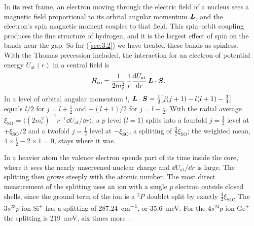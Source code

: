 In its rest frame, an electron moving through the electric field of a nucleus sees a magnetic field proportional to its orbital angular momentum $\bm{L}$, and the electron's spin magnetic moment couples to that field. This spin--orbit coupling produces the fine structure of hydrogen, and it is the largest effect of spin on the bands near the gap. So far (\cref{sec:3.2}) we have treated these bands as spinless. With the Thomas precession included, the interaction for an electron of potential energy $U_{\mathrm{at}}(r)$ in a central field is~\cite[Chap.~5]{sakurai2017modern}
\begin{equation}
  H_{\mathrm{so}} = \frac{1}{2m_e^2}\,\frac{1}{r}\frac{\mathrm{d} U_{\mathrm{at}}}{\mathrm{d} r}\,\bm{L}\cdot\bm{S} .
  \label{eq:3.3-HSO}
\end{equation}
In a level of orbital angular momentum $l$, $\bm{L}\cdot\bm{S} = \frac12[j(j+1) - l(l+1) - \frac34]$ equals $l/2$ for $j = l + \frac12$ and $-(l+1)/2$ for $j = l - \frac12$. With the radial average $\xi_{\mathrm{SO}} = \langle(2m_e^2)^{-1}r^{-1}\dd U_{\mathrm{at}}/\dd r\rangle$, a $p$ level ($l = 1$) splits into a fourfold $j = \frac32$ level at $+\xi_{\mathrm{SO}}/2$ and a twofold $j = \frac12$ level at $-\xi_{\mathrm{SO}}$, a splitting of $\frac32\xi_{\mathrm{SO}}$; the weighted mean, $4\times\frac12 - 2\times1 = 0$, stays where it was.

In a heavier atom the valence electron spends part of its time inside the core, where it sees the nearly unscreened nuclear charge and $\dd U_{\mathrm{at}}/\dd r$ is large. The splitting then grows steeply with the atomic number. The most direct measurement of the splitting uses an ion with a single $p$ electron outside closed shells, since the ground term of the ion is a $^2P$ doublet split by exactly $\frac32\xi_{\mathrm{SO}}$. The $3s^23p$ ion $\mathrm{Si}^+$ has a splitting of \SI{287.24}{cm^{-1}}, or \SI{35.6}{meV}. For the $4s^24p$ ion $\mathrm{Ge}^+$ the splitting is \SI{219}{meV}, six times more~\cite{kramida2024nist}.

